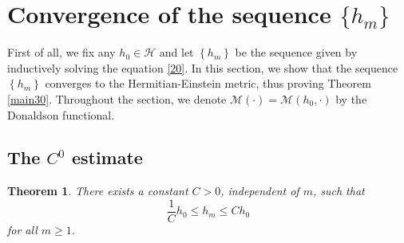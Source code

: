 \documentclass[11pt]{amsart}
\newtheorem{theorem}{Theorem}[section]
\numberwithin{equation}{section}
\theoremstyle{remark}
\newcommand{\he}{Hermitian-Einstein }
\newcommand{\M}{{\mathcal M}}
\newcommand{\hh}{{\mathcal H}}
\newcommand{\lb}{\left (}
\newcommand{\rb}{\right )}
\newcommand{\lfb}{\left \{}
\newcommand{\rfb}{\right \}}
\begin{document}
\section{Convergence of the sequence $\{h_m\}$}\label{s30}

First of all, we  fix any $h_0\in\hh$ and let $\lfb h_m\rfb$ be the sequence given by inductively solving the equation \eqref{20}. In this section, we show that the sequence $\lfb h_m\rfb$ converges to the \he metric, thus proving Theorem \ref{main30}.  Throughout the section, we denote $\M(\cdot)=\M\lb h_0,\cdot\rb$ by the Donaldson functional.

\subsection{The $C^0$ estimate} %

\begin{theorem}\label{c1000}
There exists a constant $C>0$, independent of $m$, such that
\[
\frac 1C h_0\leq h_m\leq C h_0
\]
for all $m\geq 1$.
\end{theorem}
\end{document}
